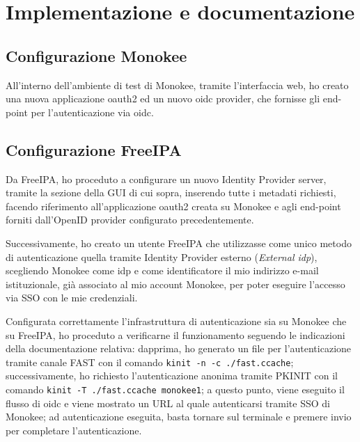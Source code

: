 
\chapter{Implementazione e documentazione}
\label{cap:implementazione-documentazione}



\section{Configurazione Monokee}
All'interno dell'ambiente di test di Monokee, tramite l'interfaccia web, ho creato una nuova applicazione \acrshort{oauth2} ed un nuovo \acrshort{oidc} provider, che fornisse gli end-point per l'autenticazione via \acrshort{oidc}.


\section{Configurazione FreeIPA}
Da FreeIPA, ho proceduto a configurare un nuovo Identity Provider server, tramite la sezione della GUI di cui sopra, inserendo tutte i metadati richiesti, facendo riferimento all'applicazione \acrshort{oauth2} creata su Monokee e agli end-point forniti dall'OpenID provider configurato precedentemente.

Successivamente, ho creato un utente FreeIPA che utilizzasse come unico metodo di autenticazione quella tramite Identity Provider esterno (\emph{External \acrshort{idp}}), scegliendo Monokee come \acrshort{idp} e come identificatore il mio indirizzo e-mail istituzionale, già associato al mio account Monokee, per poter eseguire l'accesso via SSO con le mie credenziali.  

Configurata correttamente l'infrastruttura di autenticazione sia su Monokee che su FreeIPA, ho proceduto a verificarne il funzionamento seguendo le indicazioni della documentazione relativa: dapprima, ho generato un file per l'autenticazione tramite canale FAST con il comando \texttt{kinit -n -c ./fast.ccache}; successivamente, ho richiesto l'autenticazione anonima tramite PKINIT con il comando \texttt{kinit -T ./fast.ccache monokee1}; a questo punto, viene eseguito il flusso di \acrshort{oidc} e viene mostrato un URL al quale autenticarsi tramite SSO di Monokee; ad autenticazione eseguita, basta tornare sul terminale e premere invio per completare l'autenticazione.

